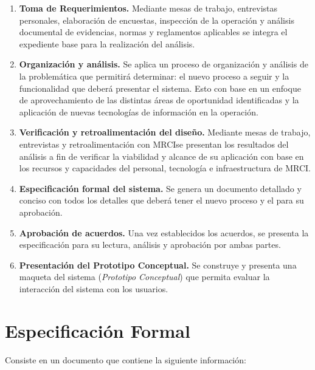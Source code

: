 \documentclass[10pt]{book}
\newcommand{\cliente}{MRCI}
\begin{document}
	
\begin{enumerate}
	\item {\bf Toma de Requerimientos.} Mediante mesas de trabajo, entrevistas personales, elaboración de encuestas, inspección de la operación y análisis documental de evidencias, normas y reglamentos aplicables se integra el expediente base para la realización del análisis.
	\item {\bf Organización y análisis.} Se aplica un proceso de organización y análisis de la problemática que permitirá determinar: el nuevo proceso a seguir y la funcionalidad que deberá presentar el sistema. Esto con base en un enfoque de aprovechamiento de las distintas áreas de oportunidad identificadas y la aplicación de nuevas tecnologías de información en la operación.
	\item {\bf Verificación y retroalimentación del diseño.} Mediante mesas de trabajo, entrevistas y retroalimentación con \cliente se presentan los resultados del análisis a fin de verificar la viabilidad y alcance de su aplicación con base en los recursos y capacidades del personal, tecnología e infraestructura de \cliente.
	\item {\bf Especificación formal del sistema.} Se genera un documento detallado y conciso con todos los detalles que deberá tener el nuevo proceso y el \proyecto para su aprobación.  
	\item {\bf Aprobación de acuerdos.} Una vez establecidos los acuerdos, se presenta la especificación para su lectura, análisis y aprobación por ambas partes.
	\item {\bf Presentación del Prototipo Conceptual.} Se construye y presenta una maqueta del sistema ({\em Prototipo Conceptual}) que permita evaluar la interacción del sistema con los usuarios.
\end{enumerate}

\section{Especificación Formal}

	Consiste en un documento que contiene la siguiente información:
	
\end{document}

